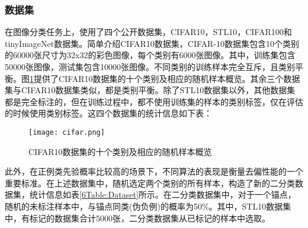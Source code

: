 \subsubsection{数据集}
在图像分类任务上，使用了四个公开数据集，CIFAR10，STL10，CIFAR100和tinyImageNet数据集。简单介绍CIFAR10数据集，CIFAR-10数据集包含10个类别的60000张尺寸为32x32的彩色图像，每个类别有6000张图像。其中，训练集包含50000张图像，测试集包含10000张图像。不同类别的训练样本完全互斥，且类别平衡。图\ref{Fig:cifar}提供了CIFAR10数据集的十个类别及相应的随机样本概览。其余三个数据集与CIFAR10数据集类似，都是类别平衡。除了STL10数据集以外，其他数据集都是完全标注的，但在训练过程中，都不使用训练集的样本的类别标签，仅在评估的时候使用类别标签。这四个数据集的统计信息如下表：
\begin{figure}[h!]
	\centering
	\texttt{[image: cifar.png]}
	\caption{CIFAR10数据集的十个类别及相应的随机样本概览}
	\label{Fig:cifar}
\end{figure}
\begin{table*}[h!]
	\centering
	\small
	\caption{图像多分类任务数据集统计信息}\label{5Table:Dataset}
\end{table*}

此外，在正例类先验概率比较高的场景下，不同算法的表现是衡量去偏性能的一个重要标准。在上述数据集中，随机选定两个类别的所有样本，构造了新的二分类数据集，统计信息如表\ref{6Table:Dataset}所示。在二分类数据集中，对于一个锚点，随机的未标注样本中，与锚点同类(伪负例)的概率为50\%。其中，STL10数据集中，有标记的数据集合计5000张，二分类数据集从已标记的样本中选取。
\begin{table*}[h!]
	\centering
	\small
	\caption{图像二分类任务数据集统计信息}\label{6Table:Dataset}
\end{table*}

